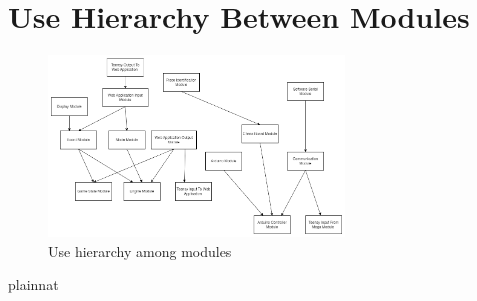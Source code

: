 \documentclass[12pt, titlepage]{article}
\begin{document}
\section{Use Hierarchy Between Modules} \label{SecUse}

\begin{figure}[H]
\centering
\includegraphics[width=0.7\textwidth]{ModuleHierarchy.png}
\caption{Use hierarchy among modules}
\label{FigUH}
\end{figure}


 {plainnat}

\end{document}
